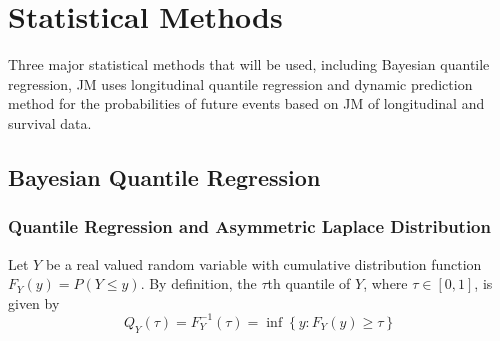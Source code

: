 






% 

\section{Statistical Methods}
Three major statistical methods that will be used, including Bayesian quantile regression, JM uses longitudinal quantile regression and dynamic prediction method for the probabilities of future events based on JM of longitudinal and survival data.

\subsection{Bayesian Quantile Regression}
\subsubsection{Quantile Regression and Asymmetric Laplace Distribution}\label{sec:QRALD}%

Let $Y$ be a real valued random variable with cumulative distribution function $F_Y(y) = P(Y \le y)$. By definition, the $\tau$th quantile of $Y$, where $\tau\in[0,1]$,  is given by
\begin{equation}\label{eqn:quantile}
Q_{Y}(\tau)=F_{Y}^{-1}(\tau)=\inf\left\{ y:F_{Y}(y)\geq\tau\right\}
\end{equation}


